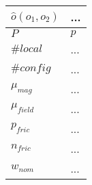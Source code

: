 \begin{xltabular}{\textwidth}{ l  X }
	$\hat{o}(o_1,o_2)$
	&
	...
	\\ \midrule
	
	$P$
	&
	$p$
	\\ \midrule
	
	$\#\textit{local}$
	&
	...
	\\ \midrule
	
	$\#\textit{config}$
	&
	...
	\\ \midrule
	
	$\mu_\textit{mag}$
	&
	...
	\\ \midrule
	
	$\mu_\textit{field}$
	&
	...
	\\ \midrule
	
	$p_\textit{fric}$
	&
	...
	\\ \midrule
	
	$n_\textit{fric}$
	&
	...
	\\ \midrule
	
	$w_\textit{nom}$
	&
	...
	\\ \bottomrule
	
\end{xltabular}